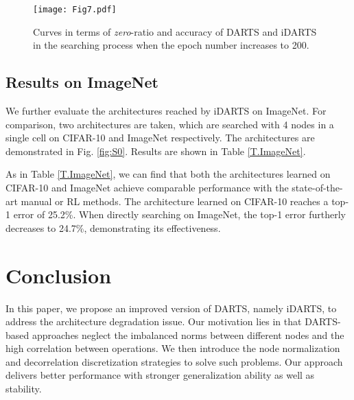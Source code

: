 \documentclass[journal]{IEEEtran}
\begin{document}
\begin{figure}[!htbp]
\begin{center}
\end{center}
	\texttt{[image: Fig7.pdf]}
	\caption{Curves in terms of \textit{zero}-ratio and accuracy of DARTS and iDARTS in the searching process when the epoch number increases to 200.}
\label{fig:epoch200}
\end{figure} 


\subsection{Results on ImageNet}

We further evaluate the architectures reached by iDARTS on ImageNet. For comparison, two architectures are taken, which are searched with 4 nodes in a single cell on CIFAR-10 and ImageNet respectively. The architectures are demonstrated in Fig. \ref{fig:S0}. Results are shown in Table \ref{T.ImageNet}.

As in Table \ref{T.ImageNet}, we can find that both the architectures learned on CIFAR-10 and ImageNet achieve comparable performance with the state-of-the-art manual or RL methods. The architecture learned on CIFAR-10 reaches a top-1 error of 25.2\%. When directly searching on ImageNet, the top-1 error furtherly decreases to 24.7\%, demonstrating its effectiveness.




\section{Conclusion}
\label{S.CON}
In this paper, we propose an improved version of DARTS, namely iDARTS, to address the architecture degradation issue. Our motivation lies in that DARTS-based approaches neglect the imbalanced norms between different nodes and the high correlation between operations. We then introduce the node normalization and decorrelation discretization strategies to solve such problems. Our approach delivers better performance with stronger generalization ability as well as stability. 
\end{document}
